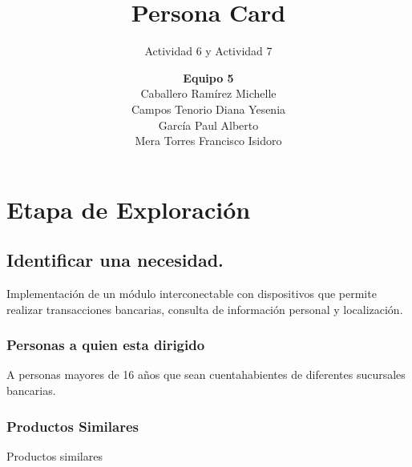 \documentclass[11pt]{book}
\title{Persona Card}
\author{\textbf{Equipo 5}\\Caballero Ramírez Michelle\\Campos Tenorio Diana Yesenia\\García Paul Alberto\\Mera Torres Francisco Isidoro}
\subtitle{Actividad 6 y Actividad 7}
\date{}
\begin{document}
	\maketitle
	\makeProjectCharter
	\makeFirmas
	\tableofcontents
\chapter{Etapa de Exploración}
	
	\section{Identificar una necesidad.}
	
	Implementación de un módulo interconectable con dispositivos que permite realizar transacciones bancarias, consulta de información personal y localización.
	
	\subsection{Personas a quien esta dirigido}

	A personas mayores de 16 años que sean cuentahabientes de diferentes sucursales bancarias.
	
	\subsection{Productos Similares}
	\begin{TablaGenerica}{Productos similares}
	\end{TablaGenerica}

\end{document}
